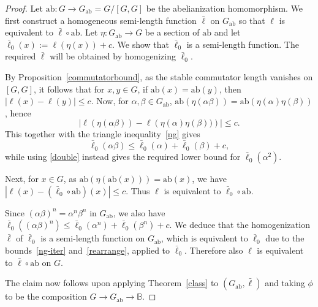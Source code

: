 \documentclass[11pt,a4paper,reqno]{amsart}
\numberwithin{equation}{section}
\theoremstyle{plain}
\theoremstyle{definition}
\newcommand\normsymb{\ell}  %
\newcommand\norm[1]{\ell({#1})}   %
\newcommand{\ab}{\mathrm{ab}}
\begin{document}
\begin{proof}

Let $\ab: G \to G_{\ab}=  G / [G, G]$ be the abelianization homomorphism.
We first construct a homogeneous { semi-}length function $\bar{\normsymb}$
on { $G_{\ab}$} so that $\normsymb$ is equivalent to $\bar{\normsymb}\circ\ab$.
Let $\eta : G_{\ab} \to G$ be a section of $\ab$ { and let $\bar{\normsymb}_0(x) := \norm{\eta(x)} + c$}. We show that
$\bar{\normsymb}_0$ is a { { semi-}length} function. The required
$\bar{\normsymb}$ will be obtained by homogenizing $\bar{\normsymb}_0$.

By Proposition~\ref{commutatorbound}, as the stable commutator length
vanishes on $[G, G]$, it follows that  for $x, y\in G$, if $\ab(x)
= \ab(y)$, then $|\norm{x} - \norm{y}| \leq c$. Now, for
$\alpha, \beta \in G_{\ab}$, $\ab(\eta(\alpha\beta)) =
\ab(\eta(\alpha)\eta(\beta))$, hence
\[
|\norm{\eta(\alpha\beta)} - \norm{\eta(\alpha)\eta(\beta))}| \leq c.
\]
This together with { the triangle inequality~\eqref{ng} gives
\[
	\bar{\normsymb}_0(\alpha\beta) \leq \bar{\normsymb}_0(\alpha) + \bar{\normsymb}_0(\beta) + c,
\]
while using \eqref{double} instead} gives the required lower bound for $\bar{\normsymb}_0(\alpha^2)$.

Next, for $x\in G$, as $\ab(\eta(\ab(x))) = \ab(x)$, we have
{ $|\normsymb(x) - (\bar{\normsymb}_0 \circ \ab)(x)| \leq c$}. Thus
$\normsymb$ is equivalent to $\bar{\normsymb}_0 \circ \ab$.

Since $(\alpha \beta)^n = \alpha^n \beta^n$ in $G_{\ab}$, we also have
$\bar{\normsymb}_0((\alpha\beta)^n) \leq \bar{\normsymb}_0(\alpha^n) +
\bar{\normsymb}_0(\beta^n) + { c}$. We deduce that the homogenization
$\bar{\normsymb}$ of $\bar{\normsymb}_0$ is a { semi-}length
function on $G_{\ab}$, which is equivalent to $\bar{\normsymb}_0$ { due to the bounds~\eqref{ng-iter} and~\eqref{rearrange}, applied to $\bar{\normsymb}_0$}. Therefore
also $\normsymb$ is equivalent to $\bar{\normsymb}\circ \ab$ on $G$.

The claim now follows upon applying Theorem~\ref{class} to
$(G_{\ab},\bar{\normsymb})$ and taking $\phi$ to be the composition $G
\to G_{\ab} \to \mathbb{B}$.
\end{proof}
\end{document}

